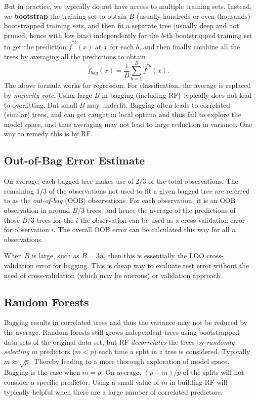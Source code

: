 \documentclass[
  letterpaper,
  DIV=11,
  numbers=noendperiod]{scrreprt}
\begin{document}
But in practice, we typically do not have access to multiple training
sets. Instead, we \textbf{bootstrap} the training set to obtain \(B\)
(usually hundreds or even thousands) bootstrapped training sets, and
then fit a separate tree (usually deep and not pruned, hence with low
bias) independently for the \(b\)-th bootstrapped training set to get
the prediction \(\hat{f}^{*b}(x)\) at \(x\) for each \(b\), and then
finally combine all the trees by averaging all the predictions to obtain
\[
\hat{f}_{bag}(x) = \frac{1}{B}\sum_{b=1}^B \hat{f}^{*b}(x).
\] The above formula works for regression. For classification, the
average is replaced by \emph{majority vote}. Using large \(B\) in
bagging (including RF) typically does not lead to overfitting. But small
\(B\) may underfit. Bagging often leads to correlated (similar) trees,
and can get caught in local optima and thus fail to explore the model
space, and thus averaging may not lead to large reduction in variance.
One way to remedy this is by RF.

\subsection{Out-of-Bag Error Estimate}\label{out-of-bag-error-estimate}

On average, each bagged tree makes use of 2/3 of the total observations.
The remaining 1/3 of the observations not used to fit a given bagged
tree are referred to as the \emph{out-of-bag} (OOB) observations. For
each observation, it is an OOB observation in around \(B/3\) trees, and
hence the average of the predictions of those \(B/3\) trees for the
\(i\)-the observation can be used as a cross-validation error for
observation \(i\). The overall OOB error can be calculated this way for
all \(n\) observations.

When \(B\) is large, such as \(B=3n\), then this is essentially the LOO
cross-validation error for bagging. This is cheap way to evaluate test
error without the need of cross-validation (which may be onerous) or
validation approach.

\subsection{Random Forests}\label{random-forests}

Bagging results in correlated trees and thus the variance may not be
reduced by the average. Random forests still grows independent trees
using bootstrapped data sets of the original data set, but RF
\emph{decorrelates} the trees by \emph{randomly selecting} \(m\)
predictors (\(m<p\)) each time a split in a tree is considered.
Typically \(m\approx \sqrt{p}\). Thereby leading to a more thorough
exploration of model space. Bagging is the case when \(m=p\). On
average, \((p-m)/p\) of the splits will not consider a specific
predictor. Using a small value of \(m\) in building RF will typically
helpful when there are a large number of correlated predictors.
\end{document}
